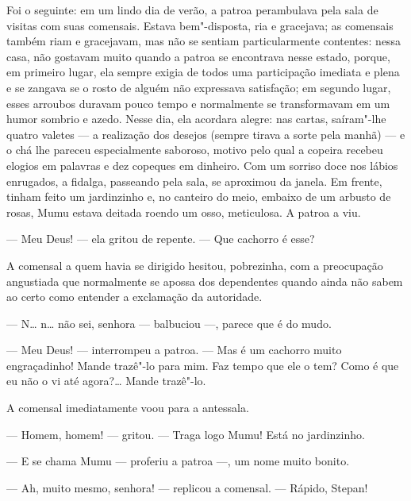 Foi o seguinte: em um lindo dia de verão, a patroa perambulava pela sala
de visitas com suas comensais. Estava bem"-disposta, ria e gracejava; as
comensais também riam e gracejavam, mas não se sentiam particularmente
contentes: nessa casa, não gostavam muito quando a patroa se encontrava
nesse estado, porque, em primeiro lugar, ela sempre exigia de todos uma
participação imediata e plena e se zangava se o rosto de alguém não
expressava satisfação; em segundo lugar, esses arroubos duravam pouco
tempo e normalmente se transformavam em um humor sombrio e azedo. Nesse
dia, ela acordara alegre: nas cartas, saíram"-lhe quatro valetes --- a
realização dos desejos (sempre tirava a sorte pela manhã) --- e o chá
lhe pareceu especialmente saboroso, motivo pelo qual a copeira recebeu
elogios em palavras e dez copeques em dinheiro. Com um sorriso doce nos
lábios enrugados, a fidalga, passeando pela sala, se aproximou da janela.
Em frente, tinham feito um jardinzinho e, no canteiro do meio, embaixo
de um arbusto de rosas, Mumu estava deitada roendo um osso, meticulosa.
A patroa a viu.

--- Meu Deus! --- ela gritou de repente. --- Que cachorro é esse?

A comensal a quem havia se dirigido hesitou, pobrezinha, com a
preocupação angustiada que normalmente se apossa dos dependentes quando
ainda não sabem ao certo como entender a exclamação da autoridade.

--- N\ldots{} n\ldots{} não sei, senhora --- balbuciou ---, parece que é do mudo.

--- Meu Deus! --- interrompeu a patroa. --- Mas é um cachorro muito
engraçadinho! Mande trazê"-lo para mim. Faz tempo que ele o tem? Como é
que eu não o vi até agora?\ldots{} Mande trazê"-lo.

A comensal imediatamente voou para a antessala.

--- Homem, homem! --- gritou. --- Traga logo Mumu! Está no jardinzinho.

--- E se chama Mumu --- proferiu a patroa ---, um nome muito bonito.

--- Ah, muito mesmo, senhora! --- replicou a comensal. --- Rápido,
Stepan!

